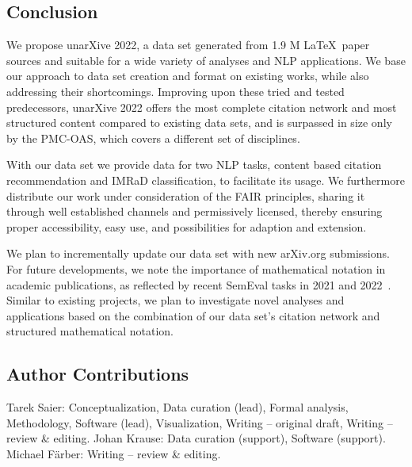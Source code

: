 \subsection{Conclusion}
We propose unarXive 2022, a data set generated from 1.9 M \LaTeX\ paper sources and suitable for a wide variety of analyses and NLP applications. We base our approach to data set creation and format on existing works, while also addressing their shortcomings. Improving upon these tried and tested predecessors, unarXive 2022 offers the most complete citation network and most structured content compared to existing data sets, and is surpassed in size only by the PMC-OAS, which covers a different set of disciplines.

With our data set we provide data for two NLP tasks, content based citation recommendation and IMRaD classification, to facilitate its usage. We furthermore distribute our work under consideration of the FAIR principles, sharing it through well established channels and permissively licensed, thereby ensuring proper accessibility, easy use, and possibilities for adaption and extension.

We plan to incrementally update our data set with new arXiv.org submissions. For future developments, we note the importance of mathematical notation in academic publications, as reflected by recent SemEval tasks in 2021 and 2022~\cite{semeval21_task8,semeval22_task12}. Similar to existing projects, we plan to investigate novel analyses and applications based on the combination of our data set's citation network and structured mathematical notation.





\subsection*{Author Contributions}  %
Tarek Saier: Conceptualization, Data curation (lead), Formal analysis, Methodology, Software (lead), Visualization, Writing -- original draft, Writing -- review \& editing. Johan Krause: Data curation (support), Software (support). Michael F{\"a}rber: Writing -- review \& editing.

